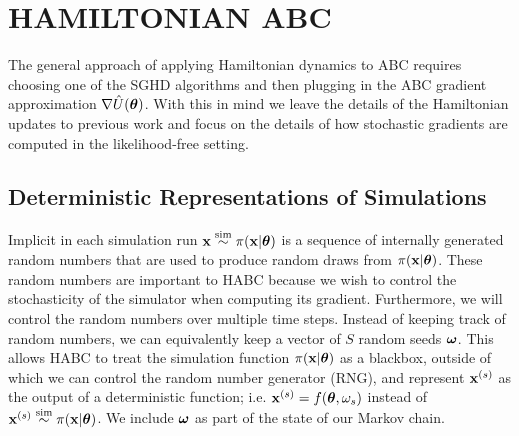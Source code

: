 \documentclass[]{article}
\begin{document}
\section{HAMILTONIAN ABC}\label{sec:habc}
The general approach of applying Hamiltonian dynamics to ABC requires choosing one of the SGHD algorithms and then plugging in the ABC gradient approximation $\nabla \hat{U}({\bm \theta})$.  With this in mind we leave the details of the Hamiltonian updates to previous work \cite{welling2011bayesian,chen2014stochastic,ding2014bayesian} and focus on the details of how stochastic gradients are computed in the likelihood-free setting.

\subsection{Deterministic Representations of Simulations}
Implicit in each simulation run ${\bf x} \overset{\operatorname{sim}}{\sim} \pi({\bf x} | {\bm \theta})$ is a sequence of internally generated random numbers that are used to produce random draws from $\pi({\bf x} | {\bm \theta})$.  These random numbers are important to HABC because we wish to control the stochasticity of the simulator when computing its gradient.  Furthermore, we will control the random numbers over multiple time steps.  Instead of keeping track of random numbers, we can equivalently keep a vector of $S$ random seeds ${\bm \omega}$.  This allows HABC to treat the simulation function $\pi({\bf x}|{\bm \theta})$ as a blackbox, outside of which we can control the random number generator (RNG), and represent ${\bf x}^{(s)}$ as the output of a deterministic function; i.e.  ${\bf x}^{(s)} = f( {\bm \theta}, \omega_s)$ instead of ${\bf x}^{(s)} \overset{\operatorname{sim}}{\sim} \pi({\bf x} | {\bm \theta})$.   We include ${\bm \omega}$ as part of the state of our Markov chain.
\end{document}
